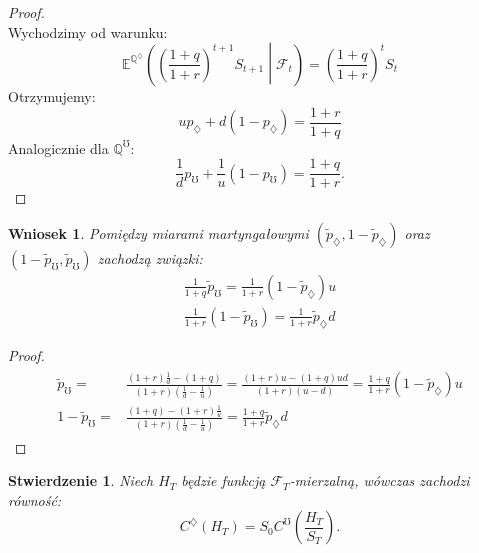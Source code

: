 \documentclass[11pt]{report}
\newtheorem{stw}{Stwierdzenie}[chapter]
\newtheorem{wn}{Wniosek}[chapter]
\begin{document}
\begin{proof} $ $ \\
Wychodzimy od warunku:
\begin{equation*}
\mathbb{E}^{\mathbb{Q}^{\diamondsuit}} \left( \left(\frac{1+q}{1+r} \right)^{t+1}S_{t+1} \middle| \mathscr{F}_t \right) = \left( \frac{1+q}{1+r} \right)^t S_t
\end{equation*}
Otrzymujemy:
\begin{equation*}
u p_{\diamondsuit} + d(1 - p_{\diamondsuit}) = \frac{1+r}{1+q}
\end{equation*}
Analogicznie dla $\mathbb{Q}^{\mho} $:
\begin{equation*}
\frac{1}{d}p_{\mho} + \frac{1}{u}(1-p_{\mho}) = \frac{1+q}{1+r}.
\end{equation*}


\end{proof}


\begin{wn}
Pomiędzy miarami martyngałowymi $(\tilde{p}_{\diamondsuit},1-\tilde{p}_{\diamondsuit})$ oraz \\ $(1-\tilde{p}_{\mho},\tilde{p}_{\mho})$ zachodzą związki:
\begin{equation}
\begin{split}
\frac{1}{1+q}\tilde{p}_{\mho} = \frac{1}{1+r}(1-\tilde{p}_{\diamondsuit}) u \\
\frac{1}{1+r}(1-\tilde{p}_{\mho}) = \frac{1}{1+r}\tilde{p}_{\diamondsuit} d
\end{split}
\end{equation}
\end{wn}

\begin{proof} $ $
\begin{multline*}
\begin{split}
\tilde{p}_{\mho} = & \frac{(1+r)\frac{1}{d}-(1+q)}{(1+r)(\frac{1}{d}-\frac{1}{u})} =
 \frac{(1+r)u-(1+q)ud}{(1+r)(u-d)} = \frac{1+q}{1+r}(1-\tilde{p}_{\diamondsuit}) u   \\ 
1 - \tilde{p}_{\mho} = & \frac{(1+q)-(1+r)\frac{1}{u}}{(1+r)(\frac{1}{d}-\frac{1}{u})} = \frac{1+q}{1+r}\tilde{p}_{\diamondsuit} d 
\end{split}
\end{multline*}
\end{proof}

\begin{stw} Niech $H_T$ będzie funkcją $\mathscr{F}_T$-mierzalną, wówczas zachodzi równość:
\begin{equation*}
C^{\diamondsuit}\left( H_T\right)  = S_0 C^{\mho}\left( \frac{H_T}{S_T}\right). 
\end{equation*}
\end{stw}
\end{document}
